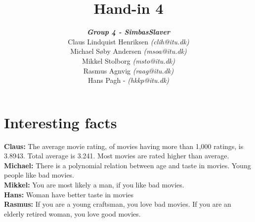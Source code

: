 \documentclass[a4paper,11pt]{article}
\title{Hand-in 4}
\author{\textbf{\textit{Group 4 - SimbasSlaver}}\\
  Claus Lindquist Henriksen \textit{(clih@itu.dk)}\\
  Michael Søby Andersen \textit{(msoa@itu.dk)}\\
  Mikkel Stolborg \textit{(msto@itu.dk)}\\
  Rasmus Agnvig \textit{(raag@itu.dk)}\\
  Hans Pagh - \textit{(hkkp@itu.dk)}
}
\begin{document}
\maketitle
\newpage
\tableofcontents
\newpage
\section{Interesting facts}
\textbf{Claus: }The average movie rating, of movies having more than 1,000
ratings, is 3.8943. Total average is 3.241. Most movies are rated higher than
average.\\
\textbf{Michael: }There is a polynomial relation between age and taste in
movies. Young people like bad movies.\\
\textbf{Mikkel: }You are most likely a man, if you like bad movies.\\
\textbf{Hans: }Woman have better taste in movies\\
\textbf{Rasmus: }If you are a young craftsman, you love bad movies. If you are
an elderly retired woman, you love good movies.\\
\newpage



\end{document}
